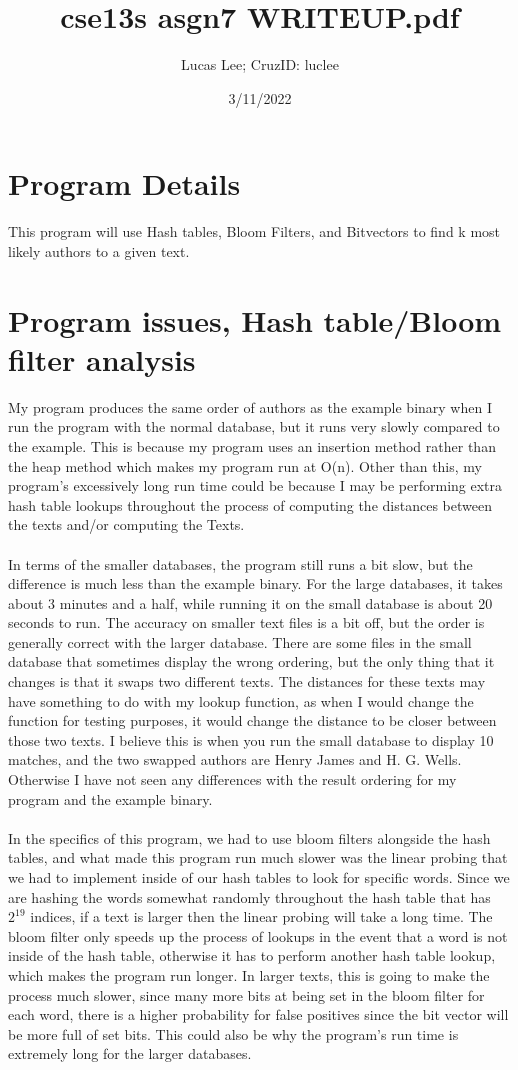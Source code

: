 \documentclass[11pt]{article}
\title{cse13s asgn7 WRITEUP.pdf}
\author{Lucas Lee; CruzID: luclee}
\date{3/11/2022}
\begin{document}
\maketitle

\section{Program Details}\label{ss:details}
This program will use Hash tables, Bloom Filters, and Bitvectors to find k most likely authors to a given text.

\section{Program issues, Hash table/Bloom filter analysis}\label{ss:issues}
My program produces the same order of authors as the example binary when I run the program with the normal database, but it runs very slowly compared to the example. This is because my program uses an insertion method rather than the heap method which makes my program run at O(n). Other than this, my program's excessively long run time could be because I may be performing extra hash table lookups throughout the process of computing the distances between the texts and/or computing the Texts. \\
\\
In terms of the smaller databases, the program still runs a bit slow, but the difference is much less than the example binary. For the large databases, it takes about 3 minutes and a half, while running it on the small database is about 20 seconds to run. The accuracy on smaller text files is a bit off, but the order is generally correct with the larger database. There are some files in the small database that sometimes display the wrong ordering, but the only thing that it changes is that it swaps two different texts. The distances for these texts may have something to do with my lookup function, as when I would change the function for testing purposes, it would change the distance to be closer between those two texts. I believe this is when you run the small database to display 10 matches, and the two swapped authors are Henry James and H. G. Wells. Otherwise I have not seen any differences with the result ordering for my program and the example binary.
\\ \\
In the specifics of this program, we had to use bloom filters alongside the hash tables, and what made this program run much slower was the linear probing that we had to implement inside of our hash tables to look for specific words. 
Since we are hashing the words somewhat randomly throughout the hash table that has \(2^{19}\) indices, if a text is larger then the linear probing will take a long time. The bloom filter only speeds up the process of lookups in the event that a word is not inside of the hash table, otherwise it has to perform another hash table lookup, which makes the program run longer. In larger texts, this is going to make the process much slower, since many more bits at being set in the bloom filter for each word, there is a higher probability for false positives since the bit vector will be more full of set bits. This could also be why the program's run time is extremely long for the larger databases.
\end{document}
